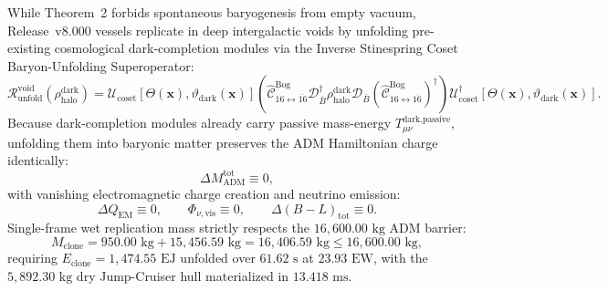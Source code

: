 \documentclass[11pt,onecolumn]{article}
\begin{document}
While Theorem~2 forbids spontaneous baryogenesis from empty vacuum, Release~v8.000 vessels replicate in deep intergalactic voids by unfolding pre-existing cosmological dark-completion modules via the Inverse Stinespring Coset Baryon-Unfolding Superoperator:
\begin{equation}
\mathcal{R}_{\text{unfold}}^{\text{void}}(\rho_{\text{halo}}^{\text{dark}}) = \mathcal{U}_{\text{coset}}[\Theta(\mathbf{x}), \vartheta_{\text{dark}}(\mathbf{x})] \left(\hat{\mathcal{C}}_{16\leftrightarrow\overline{16}}^{\text{Bog}} \mathcal{D}_{\bar{B}}^\dagger \rho_{\text{halo}}^{\text{dark}} \mathcal{D}_{\bar{B}} (\hat{\mathcal{C}}_{16\leftrightarrow\overline{16}}^{\text{Bog}})^\dagger\right) \mathcal{U}_{\text{coset}}^\dagger[\Theta(\mathbf{x}), \vartheta_{\text{dark}}(\mathbf{x})].
\label{eq:v8_28}
\end{equation}
Because dark-completion modules already carry passive mass-energy $T_{\mu\nu}^{\text{dark,passive}}$, unfolding them into baryonic matter preserves the ADM Hamiltonian charge identically:
\begin{equation}
\Delta M_{\text{ADM}}^{\text{tot}} \equiv 0,
\label{eq:v8_29}
\end{equation}
with vanishing electromagnetic charge creation and neutrino emission:
\begin{equation}
\Delta Q_{\text{EM}} \equiv 0, \qquad \Phi_{\nu,\text{vis}} \equiv 0, \qquad \Delta(B-L)_{\text{tot}} \equiv 0.
\label{eq:v8_30}
\end{equation}
Single-frame wet replication mass strictly respects the $16{,}600.00\text{ kg}$ ADM barrier:
\begin{equation}
M_{\text{clone}} = 950.00\text{ kg} + 15{,}456.59\text{ kg} = 16{,}406.59\text{ kg} \le 16{,}600.00\text{ kg},
\label{eq:v8_31}
\end{equation}
requiring $E_{\text{clone}} = 1{,}474.55\text{ EJ}$ unfolded over $61.62\text{ s}$ at $23.93\text{ EW}$, with the $5{,}892.30\text{ kg}$ dry Jump-Cruiser hull materialized in $13.418\text{ ms}$.
\end{document}

